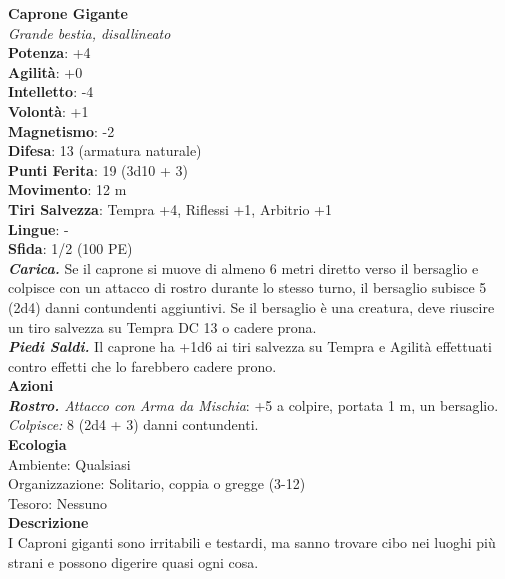 \begin{multicols}{2}
\medskip\textbf{Caprone Gigante}\\
\emph{Grande bestia, disallineato}\\
\textbf{Potenza}: +4\\
\textbf{Agilità}: +0\\
\textbf{Intelletto}: -4\\
\textbf{Volontà}: +1\\
\textbf{Magnetismo}: -2\\
\textbf{Difesa}: 13 (armatura naturale)\\
\textbf{Punti Ferita}: 19 (3d10 + 3)\\
\textbf{Movimento}: 12 m\\
\textbf{Tiri Salvezza}: Tempra +4, Riflessi +1, Arbitrio +1 \\
\textbf{Lingue}: -\\
\textbf{Sfida}: 1/2 (100 PE)\smallskip\\
\emph{\textbf{Carica.}} Se il caprone si muove di almeno 6 metri diretto verso il bersaglio e colpisce con un attacco di rostro durante lo stesso turno, il bersaglio subisce 5 (2d4) danni contundenti aggiuntivi. Se il bersaglio è una creatura, deve riuscire un tiro salvezza su Tempra DC 13 o cadere prona.\\
\emph{\textbf{Piedi Saldi.}} Il caprone ha +1d6 ai tiri salvezza su Tempra e Agilità effettuati contro effetti che lo farebbero cadere prono.\\
\smallskip\textbf{Azioni}\\
\emph{\textbf{Rostro.} Attacco con Arma da Mischia}: +5 a colpire, portata 1 m, un bersaglio.\\
\emph{Colpisce:} 8 (2d4 + 3) danni contundenti.\\
\textbf{Ecologia}\\
Ambiente: Qualsiasi\\
Organizzazione: Solitario, coppia o gregge (3-12)\\
Tesoro: Nessuno\\
\textbf{Descrizione}\\
I Caproni giganti sono irritabili e testardi, ma sanno trovare cibo nei luoghi più strani e possono digerire quasi ogni cosa. \\


\end{multicols}
